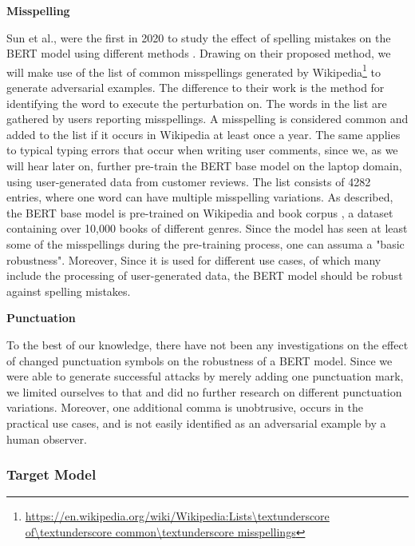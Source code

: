 \textbf{Misspelling}

Sun et al., were the first in 2020 to study the effect of spelling mistakes on the BERT model using different methods \cite{sun2020adv}. Drawing on their proposed method, we will make use of the list of common misspellings generated by Wikipedia\footnote{\url{https://en.wikipedia.org/wiki/Wikipedia:Lists\textunderscore of\textunderscore common\textunderscore misspellings}} to generate adversarial examples. The difference to their work is the method for identifying the word to execute the perturbation on. 
The words in the list are gathered by users reporting misspellings. A misspelling is considered common and added to the list if it occurs in Wikipedia at least once a year. The same applies to typical typing errors that occur when writing user comments, since we, as we will hear later on, further pre-train the BERT base model on the laptop domain, using user-generated data from customer reviews. 
The list consists of 4282 entries, where one word can have multiple misspelling variations. As described, the BERT base model is pre-trained on Wikipedia and book corpus \cite{zhu2015aligning}, a dataset containing over 10,000 books of different genres. Since the model has seen at least some of the misspellings during the pre-training process, one can assuma a "basic robustness". Moreover,  Since it is used for different use cases, of which many include the processing of user-generated data, the BERT model should be robust against spelling mistakes.

\textbf{Punctuation}

To the best of our knowledge, there have not been any investigations on the effect of changed punctuation symbols on the robustness of a BERT model. Since we were able to generate successful attacks by merely adding one punctuation mark, we limited ourselves to that and did no further research on different punctuation variations. Moreover, one additional comma is unobtrusive, occurs in the practical use cases, and is not easily identified as an adversarial example by a human observer.


\subsubsection{Target Model} 
\label{sec:target_model_method}

